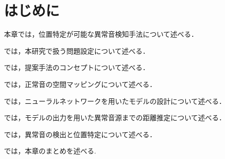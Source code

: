 \documentclass[../main]{subfiles}
\begin{document}
\section{はじめに}
\label{sec:pmethod_introduction}

本章では，位置特定が可能な異常音検知手法について述べる．

では，本研究で扱う問題設定について述べる．

では，提案手法のコンセプトについて述べる．

では，正常音の空間マッピングについて述べる．

では，ニューラルネットワークを用いたモデルの設計について述べる．

では，モデルの出力を用いた異常音源までの距離推定について述べる．

では，異常音の検出と位置特定について述べる．

では，本章のまとめを述べる.
\end{document}
